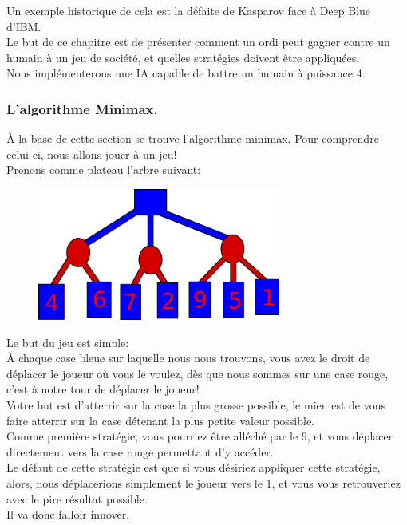 \documentclass[a4paper, 12pt]{article}
\numberwithin{equation}{subsection}
\begin{document}
Un exemple historique de cela est la défaite de Kasparov face à Deep Blue d'IBM.\\

Le but de ce chapitre est de présenter comment un ordi peut gagner contre un humain à un jeu de société, et quelles stratégies doivent être appliquées.\\

Nous implémenterons une IA capable de battre un humain à puissance 4.\\
\subsubsection{L'algorithme Minimax.}
À la base de cette section se trouve l'algorithme minimax. Pour comprendre celui-ci, nous allons jouer à un jeu!\\
Prenons comme plateau l'arbre suivant:
\begin{figure}[H]
  \centering
  \includegraphics[width=8.0cm]{imgs/minimax_start.png}
\end{figure}
Le but du jeu est simple: \\

À chaque case bleue sur laquelle nous nous trouvons, vous avez le droit de déplacer le joueur où vous le voulez, dès que nous sommes sur une case rouge, c'est à notre tour de déplacer le joueur!\\

Votre but est d'atterrir sur la case la plus grosse possible, le mien est de vous faire atterrir sur la case détenant la plus petite valeur possible.\\

Comme première stratégie, vous pourriez être alléché par le 9, et vous déplacer directement vers la case rouge permettant d'y accéder. \\

Le défaut de cette stratégie est que si vous désiriez appliquer cette stratégie, alors, nous déplacerions simplement le joueur vers le 1, et vous vous retrouveriez avec le pire résultat possible.\\
Il va donc falloir innover.\\
\end{document}
